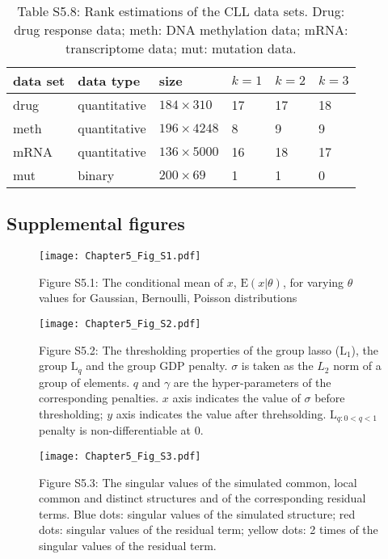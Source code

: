 \begin{table}[htbp]
\centering
\caption*{Table S5.8: Rank estimations of the CLL data sets. Drug: drug response data; meth: DNA methylation data; mRNA: transcriptome data; mut: mutation data.}
\label{chapter5_tab:S8}
\begin{tabular}{llllll}
  \toprule
  data set & data type    & size              & $k=1$ & $k=2$ & $k=3$ \\
  \midrule
  drug     & quantitative & $184 \times 310$  & 17 & 17 & 18   \\
  meth     & quantitative & $196 \times 4248$ & 8  & 9  & 9   \\
  mRNA     & quantitative & $136 \times 5000$ & 16 & 18 & 17   \\
  mut      & binary       & $200 \times 69$   & 1  & 1  & 0   \\
  \bottomrule
\end{tabular}
\end{table}

\subsection{Supplemental figures}
\begin{figure}[htbp]
    \centering
    \texttt{[image: Chapter5\_Fig\_S1.pdf]}
    \caption*{Figure S5.1: The conditional mean of $x$, $\text{E}(x|\theta)$, for varying $\theta$ values for Gaussian, Bernoulli, Poisson distributions}
	\label{chapter5_fig:S1}
\end{figure}

\begin{figure}[h]
    \centering
    \texttt{[image: Chapter5\_Fig\_S2.pdf]}
    \caption*{Figure S5.2: The thresholding properties of the group lasso ($\text{L}_1$), the group $\text{L}_{q}$ and the group GDP penalty. $\sigma$ is taken as the $L_2$ norm of a group of elements. $q$ and $\gamma$ are the hyper-parameters of the corresponding penalties. $x$ axis indicates the value of $\sigma$ before thresholding; $y$ axis indicates the value after threhsolding. $\text{L}_{q: 0<q < 1}$ penalty is non-differentiable at 0.}
	\label{chapter5_fig:S2}
\end{figure}

\begin{figure}[htbp]
    \centering
    \texttt{[image: Chapter5\_Fig\_S3.pdf]}
    \caption*{Figure S5.3: The singular values of the simulated common, local common and distinct structures and of the corresponding residual terms. Blue dots: singular values of the simulated structure; red dots: singular values of the residual term; yellow dots: 2 times of the singular values of the residual term.}
	\label{chapter5_fig:S3}
\end{figure}

